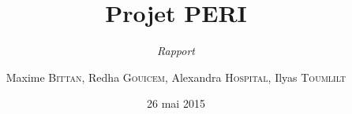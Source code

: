 \documentclass{scrreprt}
\begin{document}
\title{Projet PERI}
\subtitle{\textit{Rapport}}
\date{26 mai 2015}
\author{Maxime \textsc{Bittan}, Redha \textsc{Gouicem}, Alexandra \textsc{Hospital}, Ilyas \textsc{Toumlilt}}
\maketitle
\tableofcontents \newpage


%
%



\end{document}
